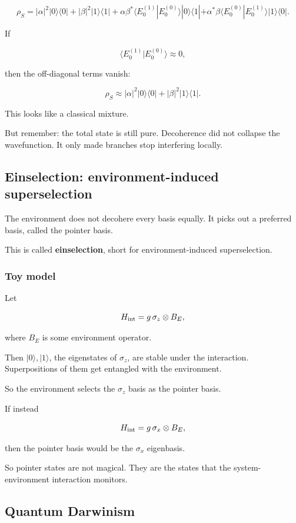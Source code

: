 \documentclass[11pt,a4paper]{article}
\begin{document}
\[
\rho_S
=
|\alpha|^2 |0\rangle\langle 0|
+
|\beta|^2 |1\rangle\langle 1|
+
\alpha\beta^* \langle E_0^{(1)}|E_0^{(0)}\rangle |0\rangle\langle 1|
+
\alpha^*\beta \langle E_0^{(0)}|E_0^{(1)}\rangle |1\rangle\langle 0|.
\]

If

\[
\langle E_0^{(1)}|E_0^{(0)}\rangle \approx 0,
\]

then the off-diagonal terms vanish:

\[
\rho_S \approx
|\alpha|^2 |0\rangle\langle 0|
+
|\beta|^2 |1\rangle\langle 1|.
\]

This looks like a classical mixture.

But remember: the total state is still pure. Decoherence did not collapse the wavefunction. It only made branches stop interfering locally.

\subsection{Einselection: environment-induced superselection}

The environment does not decohere every basis equally. It picks out a preferred basis, called the pointer basis.

This is called \textbf{einselection}, short for environment-induced superselection.

\subsubsection{Toy model}

Let

\[
H_{\rm int}=g\, \sigma_z \otimes B_E,
\]

where $B_E$ is some environment operator.

Then $|0\rangle,|1\rangle$, the eigenstates of $\sigma_z$, are stable under the interaction. Superpositions of them get entangled with the environment.

So the environment selects the $\sigma_z$ basis as the pointer basis.

If instead

\[
H_{\rm int}=g\, \sigma_x \otimes B_E,
\]

then the pointer basis would be the $\sigma_x$ eigenbasis.

So pointer states are not magical. They are the states that the system-environment interaction monitors.

\subsection{Quantum Darwinism}
\end{document}
